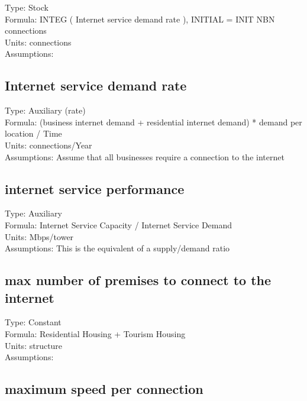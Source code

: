 \documentclass[
  11pt,
]{book}
\begin{document}
Type: Stock\\
Formula: INTEG ( Internet service demand rate ), INITIAL = INIT NBN connections\\
Units: connections\\
Assumptions:

\hypertarget{internet-service-demand-rate}{%
\subsection{Internet service demand rate}\label{internet-service-demand-rate}}

Type: Auxiliary (rate)\\
Formula: (business internet demand + residential internet demand) * demand per location / Time\\
Units: connections/Year\\
Assumptions: Assume that all businesses require a connection to the internet

\hypertarget{internet-service-performance}{%
\subsection{internet service performance}\label{internet-service-performance}}

Type: Auxiliary\\
Formula: Internet Service Capacity / Internet Service Demand\\
Units: Mbps/tower\\
Assumptions: This is the equivalent of a supply/demand ratio

\hypertarget{max-number-of-premises-to-connect-to-the-internet}{%
\subsection{max number of premises to connect to the internet}\label{max-number-of-premises-to-connect-to-the-internet}}

Type: Constant\\
Formula: Residential Housing + Tourism Housing\\
Units: structure\\
Assumptions:

\hypertarget{maximum-speed-per-connection}{%
\subsection{maximum speed per connection}\label{maximum-speed-per-connection}}
\end{document}
